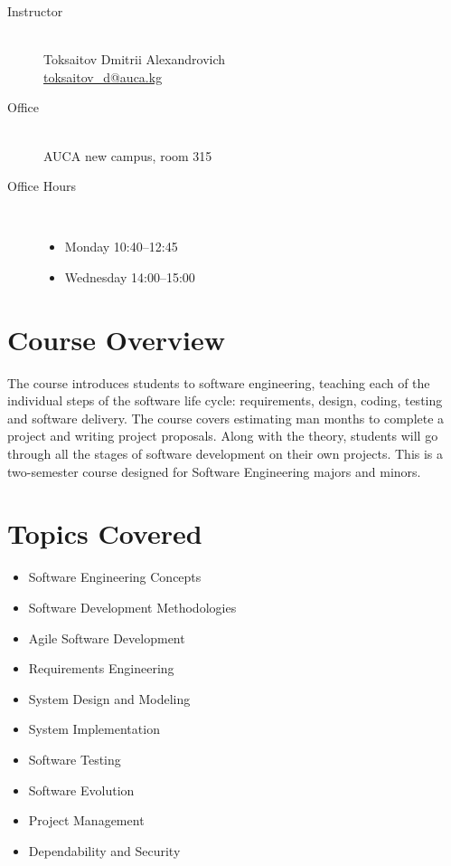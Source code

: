 \documentclass[12pt,a4paper,oneside]{article}
\begin{document}
            \begin{description}
                \item[Instructor]\hfill\\
                    Toksaitov Dmitrii Alexandrovich\\
                    \href{mailto:toksaitov_d@auca.kg}{toksaitov\_d@auca.kg}
                \item[Office]\hfill\\
                    AUCA new campus, room 315
                \item[Office Hours]\hfill\\
                    \begin{itemize}
                        \item Monday 10:40--12:45
                        \item Wednesday 14:00--15:00
                    \end{itemize}
            \end{description}

    \section{Course Overview}

        The course introduces students to software engineering, teaching each of the individual steps of the software life cycle: requirements, design, coding, testing and software delivery. The course covers estimating man months to complete a project and writing project proposals. Along with the theory, students will go through all the stages of software development on their own projects. This is a two-semester course designed for Software Engineering majors and minors.

    \section{Topics Covered}

        \begin{itemize}
            \item Software Engineering Concepts
            \item Software Development Methodologies
            \item Agile Software Development
            \item Requirements Engineering
            \item System Design and Modeling
            \item System Implementation
            \item Software Testing
            \item Software Evolution
            \item Project Management
            \item Dependability and Security
        \end{itemize}
\end{document}
